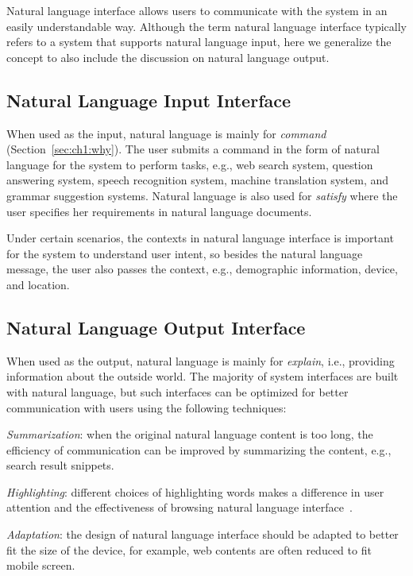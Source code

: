 Natural language interface allows users to communicate with the system in an easily understandable way. Although the term natural language interface typically refers to a system that supports natural language input, here we generalize the concept to also include the discussion on natural language output. 

\subsection{Natural Language Input Interface}

When used as the input, natural language is mainly for \textit{command} (Section~\ref{sec:ch1:why}). The user submits a command in the form of natural language for the system to perform tasks, e.g., web search system, question answering system, speech recognition system, machine translation system, and grammar suggestion systems. Natural language is also used for \textit{satisfy} where the user specifies her requirements in natural language documents. 

Under certain scenarios, the contexts in natural language interface is important for the system to understand user intent, so besides the natural language message, the user also passes the context, e.g., demographic information, device, and location. 

\subsection{Natural Language Output Interface}

When used as the output, natural language is mainly for \textit{explain}, i.e., providing information about the outside world. The majority of system interfaces are built with natural language, but such interfaces can be optimized for better communication with users using the following techniques:

\textit{Summarization}: when the original natural language content is too long, the efficiency of communication can be improved by summarizing the content, e.g., search result snippets. 

\textit{Highlighting}: different choices of highlighting words makes a difference in user attention and the effectiveness of browsing natural language interface~\cite{patel2005systems}.

\textit{Adaptation}: the design of natural language interface should be adapted to better fit the size of the device, for example, web contents are often reduced to fit mobile screen. 

